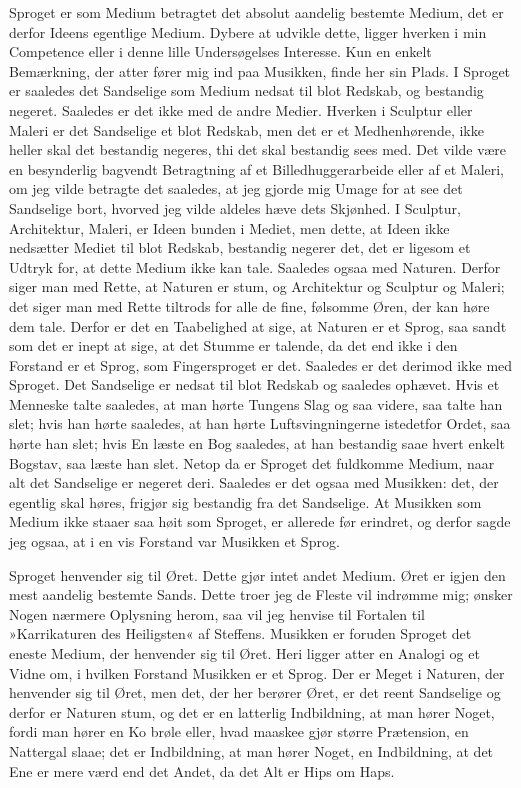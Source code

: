 \documentclass[12pt,a4paper]{article}
\begin{document}
Sproget er som Medium betragtet det absolut aandelig bestemte Medium, det er derfor Ideens egentlige Medium. Dybere at udvikle dette, ligger hverken i min Competence eller i denne lille Undersøgelses Interesse. Kun en enkelt Bemærkning, der atter fører mig ind paa Musikken, finde her sin Plads. I Sproget er saaledes det Sandselige som Medium nedsat til blot Redskab, og bestandig negeret. Saaledes er det ikke med de andre Medier. Hverken i Sculptur eller Maleri er det Sandselige et blot Redskab, men det er et Medhenhørende, ikke heller skal det bestandig negeres, thi det skal bestandig sees med. Det vilde være en besynderlig bagvendt Betragtning af et Billedhuggerarbeide eller af et Maleri, om jeg vilde betragte det saaledes, at jeg gjorde mig Umage for at see det Sandselige bort, hvorved jeg vilde aldeles hæve dets Skjønhed. I Sculptur, Architektur, Maleri, er Ideen bunden i Mediet, men dette, at Ideen ikke nedsætter Mediet til blot Redskab, bestandig negerer det, det er ligesom et Udtryk for, at dette Medium ikke kan tale. Saaledes ogsaa med Naturen. Derfor siger man med Rette, at Naturen er stum, og Architektur og Sculptur og Maleri; det siger man med Rette tiltrods for alle de fine, følsomme Øren, der kan høre dem tale. Derfor er det en Taabelighed at sige, at Naturen er et Sprog, saa sandt som det er inept at sige, at det Stumme er talende, da det end ikke i den Forstand er et Sprog, som Fingersproget er det. Saaledes er det derimod ikke med Sproget. Det Sandselige er nedsat til blot Redskab og saaledes ophævet. Hvis et Menneske talte saaledes, at man hørte Tungens Slag og saa videre, saa talte han slet; hvis han hørte saaledes, at han hørte Luftsvingningerne istedetfor Ordet, saa hørte han slet; hvis En læste en Bog saaledes, at han bestandig saae hvert enkelt Bogstav, saa læste han slet. Netop da er Sproget det fuldkomme Medium, naar alt det Sandselige er negeret deri. Saaledes er det ogsaa med Musikken: det, der egentlig skal høres, frigjør sig bestandig fra det Sandselige. At Musikken som Medium ikke staaer saa høit som Sproget, er allerede før erindret, og derfor sagde jeg ogsaa, at i en vis Forstand var Musikken et Sprog.

Sproget henvender sig til Øret. Dette gjør intet andet Medium. Øret er igjen den mest aandelig bestemte Sands. Dette troer jeg de Fleste vil indrømme mig; ønsker Nogen nærmere Oplysning herom, saa vil jeg henvise til Fortalen til »Karrikaturen des Heiligsten« af Steffens. Musikken er foruden Sproget det eneste Medium, der henvender sig til Øret. Heri ligger atter en Analogi og et Vidne om, i hvilken Forstand Musikken er et Sprog. Der er Meget i Naturen, der henvender sig til Øret, men det, der her berører Øret, er det reent Sandselige og derfor er Naturen stum, og det er en latterlig Indbildning, at man hører Noget, fordi man hører en Ko brøle eller, hvad maaskee gjør større Prætension, en Nattergal slaae; det er Indbildning, at man hører Noget, en Indbildning, at det Ene er mere værd end det Andet, da det Alt er Hips om Haps.
\end{document}
